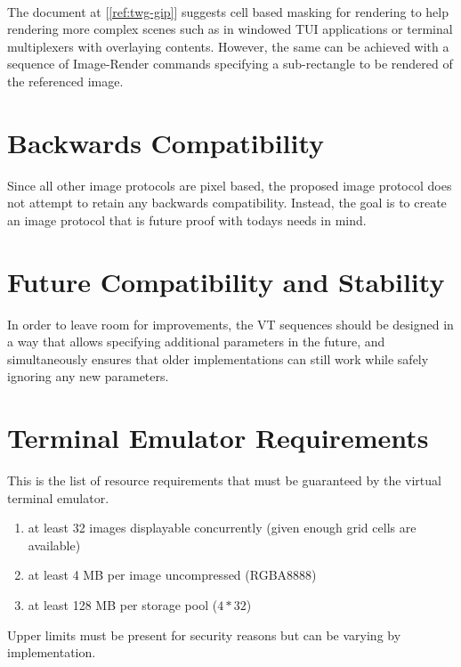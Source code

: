 \documentclass[a4paper]{article}
\begin{document}
\paragraph*{}

The document at [\ref{ref:twg-gip}] suggests cell based masking for rendering to help rendering more
complex scenes such as in windowed TUI applications or terminal multiplexers with overlaying contents.
However, the same can be achieved with a sequence of Image-Render commands specifying a
sub-rectangle to be rendered of the referenced image.

\section{Backwards Compatibility} %

Since all other image protocols are pixel based, the proposed image protocol does not
attempt to retain any backwards compatibility. Instead, the goal is to create
an image protocol that is future proof with todays needs in mind.

\section{Future Compatibility and Stability} %

In order to leave room for improvements, the VT sequences should be designed in a way
that allows specifying additional parameters in the future, and simultaneously ensures
that older implementations can still work while safely ignoring any new parameters.

\section{Terminal Emulator Requirements} %

This is the list of resource requirements that must be guaranteed
by the virtual terminal emulator.

\begin{enumerate}
    \item at least 32 images displayable concurrently
          (given enough grid cells are available)
    \item at least 4 MB per image uncompressed (RGBA8888)
    \item at least 128 MB per storage pool (\(4 * 32\))
\end{enumerate}

Upper limits must be present for security reasons but can be varying by implementation.
\end{document}
